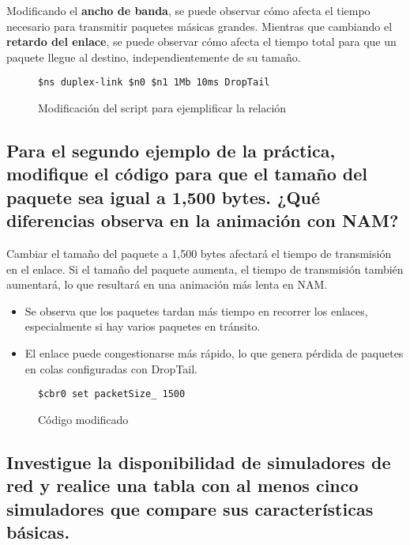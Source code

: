 \noindent Modificando el \textbf{ancho de banda}, se puede observar c\'omo afecta el tiempo necesario para transmitir paquetes m\'asicas
grandes. Mientras que cambiando el \textbf{retardo del enlace}, se puede observar c\'omo afecta el tiempo total para que un paquete
llegue al destino, independientemente de su tamaño. 

\begin{figure}[H]
  \centering
  \begin{lstlisting}[frame=single, breaklines=true, basicstyle=\footnotesize\ttfamily, breakatwhitespace=false, 
    columns=flexible, tabsize=2, showstringspaces=false]
    $ns duplex-link $n0 $n1 1Mb 10ms DropTail
  \end{lstlisting}
  \caption{Modificaci\'on del script para ejemplificar la relaci\'on}
\end{figure}

\subsection*{Para el segundo ejemplo de la pr\'actica, modifique el c\'odigo para que el tamaño del paquete sea igual a 1,500 bytes.
¿Qu\'e diferencias observa en la animaci\'on con NAM?}
\noindent Cambiar el tamaño del paquete a 1,500 bytes afectar\'a el tiempo de transmisi\'on en el enlace. Si el tamaño del paquete aumenta, el 
tiempo de transmisi\'on tambi\'en aumentar\'a, lo que resultar\'a en una animaci\'on m\'as lenta en NAM.
\begin{itemize}
  \item Se observa que los paquetes tardan más tiempo en recorrer los enlaces, especialmente si hay varios paquetes en tránsito.
  \item El enlace puede congestionarse más r\'apido, lo que genera p\'erdida de paquetes en colas configuradas con DropTail.
\end{itemize}

\begin{figure}[H]
  \centering
  \begin{lstlisting}[frame=single, breaklines=true, basicstyle=\footnotesize\ttfamily, breakatwhitespace=false, 
    columns=flexible, tabsize=2, showstringspaces=false]
    $cbr0 set packetSize_ 1500
  \end{lstlisting}
  \caption{C\'odigo modificado}
\end{figure}


\subsection*{Investigue la disponibilidad de simuladores de red y realice una tabla con al menos cinco simuladores que compare sus
caracter\'isticas b\'asicas.}


